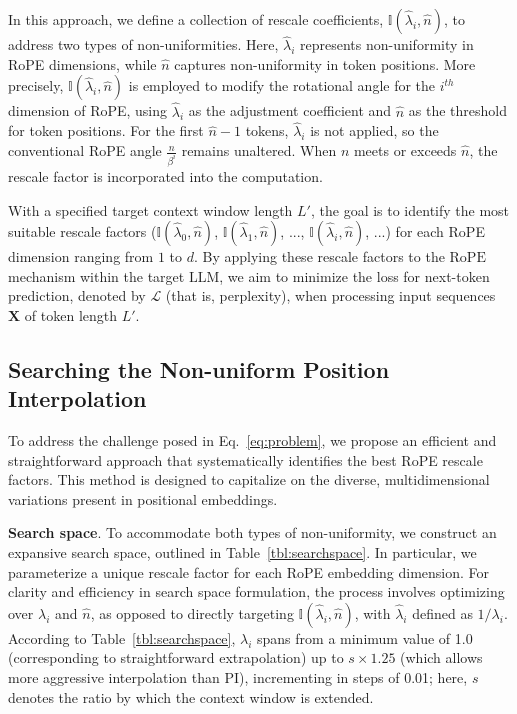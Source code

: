 In this approach, we define a collection of rescale coefficients, $\mathbb{I}(\hat{\lambda}_{i},\hat{n})$, to address two types of non-uniformities. Here, $\hat{\lambda}_i$ represents non-uniformity in RoPE dimensions, while $\hat{n}$ captures non-uniformity in token positions. More precisely, $\mathbb{I}(\hat{\lambda}_{i},\hat{n})$ is employed to modify the rotational angle for the $i^{th}$ dimension of RoPE, using $\hat\lambda_{i}$ as the adjustment coefficient and $\hat{n}$ as the threshold for token positions. For the first $\hat{n}-1$ tokens, $\hat\lambda_{i}$ is not applied, so the conventional RoPE angle $\frac{n}{\beta^i}$ remains unaltered. When $n$ meets or exceeds $\hat{n}$, the rescale factor is incorporated into the computation.

With a specified target context window length $L'$, the goal is to identify the most suitable rescale factors ($\mathbb{I}(\hat{\lambda}_{0},\hat{n})$, $\mathbb{I}(\hat{\lambda}_{1},\hat{n})$, ..., $\mathbb{I}(\hat{\lambda}_{i},\hat{n})$, ...) for each RoPE dimension ranging from $1$ to $d$. By applying these rescale factors to the $\text{RoPE}$ mechanism within the target $\text{LLM}$, we aim to minimize the loss for next-token prediction, denoted by $\mathcal{L}$ (that is, perplexity), when processing input sequences $\mathbf{X}$ of token length $L'$.

\subsection{Searching the Non-uniform Position Interpolation}

To address the challenge posed in Eq.~\ref{eq:problem}, we propose an efficient and straightforward approach that systematically identifies the best RoPE rescale factors. This method is designed to capitalize on the diverse, multidimensional variations present in positional embeddings.

\textbf{Search space}. To accommodate both types of non-uniformity, we construct an expansive search space, outlined in Table~\ref{tbl:searchspace}. In particular, we parameterize a unique rescale factor for each RoPE embedding dimension. For clarity and efficiency in search space formulation, the process involves optimizing over $\lambda_i$ and $\hat{n}$, as opposed to directly targeting $\mathbb{I}(\hat{\lambda}_{i},\hat{n})$, with $\hat{\lambda}_{i}$ defined as $1/\lambda_i$. According to Table~\ref{tbl:searchspace}, $\lambda_i$ spans from a minimum value of 1.0 (corresponding to straightforward extrapolation) up to $s\times1.25$ (which allows more aggressive interpolation than PI), incrementing in steps of 0.01; here, $s$ denotes the ratio by which the context window is extended.

